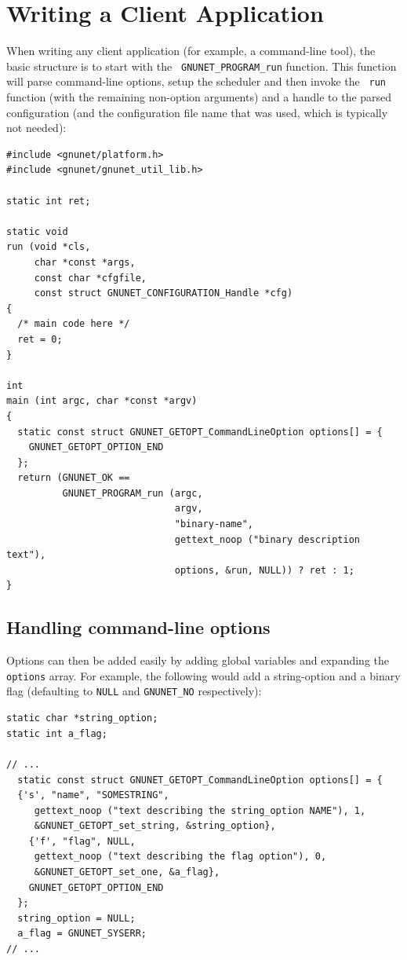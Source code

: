 \documentclass[10pt]{article}
\begin{document}
\section{Writing a Client Application}

When writing any client application (for example, a command-line
tool), the basic structure is to start with the {\tt
  GNUNET\_PROGRAM\_run} function.  This function will parse
command-line options, setup the scheduler and then invoke the {\tt
  run} function (with the remaining non-option arguments) and a handle
to the parsed configuration (and the configuration file name that was
used, which is typically not needed):

\lstset{language=c}
\begin{lstlisting}
#include <gnunet/platform.h>
#include <gnunet/gnunet_util_lib.h>

static int ret;

static void
run (void *cls,
     char *const *args,
     const char *cfgfile,
     const struct GNUNET_CONFIGURATION_Handle *cfg)
{
  /* main code here */
  ret = 0;
}

int
main (int argc, char *const *argv)
{
  static const struct GNUNET_GETOPT_CommandLineOption options[] = {
    GNUNET_GETOPT_OPTION_END
  };
  return (GNUNET_OK ==
          GNUNET_PROGRAM_run (argc,
                              argv,
                              "binary-name",
                              gettext_noop ("binary description text"),
                              options, &run, NULL)) ? ret : 1;
}
\end{lstlisting}

\subsection{Handling command-line options}

Options can then be added easily by adding global variables and
expanding the {\tt options} array.  For example, the following would
add a string-option and a binary flag (defaulting to {\tt NULL} and
{\tt GNUNET\_NO} respectively):

\begin{lstlisting}
static char *string_option;
static int a_flag;

// ...
  static const struct GNUNET_GETOPT_CommandLineOption options[] = {
  {'s', "name", "SOMESTRING",
     gettext_noop ("text describing the string_option NAME"), 1,
     &GNUNET_GETOPT_set_string, &string_option},
    {'f', "flag", NULL,
     gettext_noop ("text describing the flag option"), 0,
     &GNUNET_GETOPT_set_one, &a_flag},
    GNUNET_GETOPT_OPTION_END
  };
  string_option = NULL;
  a_flag = GNUNET_SYSERR;
// ...
\end{lstlisting}
\end{document}
